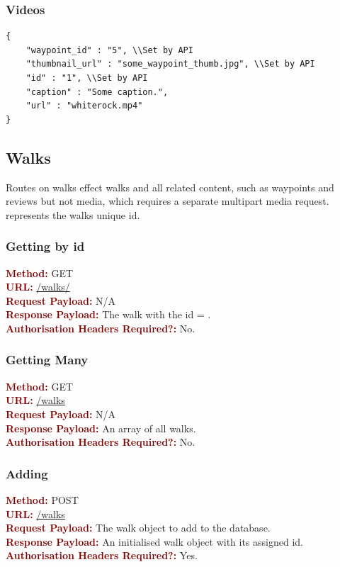 \documentclass[11pt,a4paper]{report}
\begin{document}
\subsubsection{Videos}

\begin{lstlisting}[captionpos=b, caption=An example JSON Waypoint Object., label=lst:walk]
{
    "waypoint_id" : "5", \\Set by API
    "thumbnail_url" : "some_waypoint_thumb.jpg", \\Set by API
    "id" : "1", \\Set by API
    "caption" : "Some caption.",
    "url" : "whiterock.mp4"
}
\end{lstlisting}

\subsection{Walks}

Routes on walks effect walks and all related content, such as waypoints and reviews but not media, which requires a separate multipart media request.  represents the walks unique id.

\subsubsection{Getting by id}
\textbf{\textcolor{Maroon}{Method:}} GET\\
\textbf{\textcolor{Maroon}{URL:}} \url{/walks/}\\
\textbf{\textcolor{Maroon}{Request Payload:}} N/A\\
\textbf{\textcolor{Maroon}{Response Payload:}} The walk with the id = .\\
\textbf{\textcolor{Maroon}{Authorisation Headers Required?:}} No.

\subsubsection{Getting Many}
\textbf{\textcolor{Maroon}{Method:}} GET\\
\textbf{\textcolor{Maroon}{URL:}} \url{/walks}\\
\textbf{\textcolor{Maroon}{Request Payload:}} N/A\\
\textbf{\textcolor{Maroon}{Response Payload:}} An array of all walks.\\
\textbf{\textcolor{Maroon}{Authorisation Headers Required?:}} No.

\subsubsection{Adding}
\textbf{\textcolor{Maroon}{Method:}} POST\\
\textbf{\textcolor{Maroon}{URL:}} \url{/walks}\\
\textbf{\textcolor{Maroon}{Request Payload:}} The walk object to add to the database.\\
\textbf{\textcolor{Maroon}{Response Payload:}} An initialised walk object with its assigned id.\\
\textbf{\textcolor{Maroon}{Authorisation Headers Required?:}} Yes.
\end{document}
